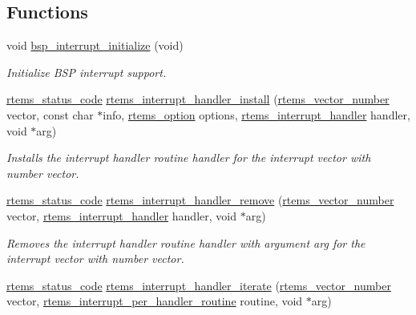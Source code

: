 \subsection*{Functions}
\begin{DoxyCompactItemize}
\item 
void \mbox{\hyperlink{group__bsp__interrupt_gafccb8719531b51a8cf0163febeb42b29}{bsp\+\_\+interrupt\+\_\+initialize}} (void)
\begin{DoxyCompactList}\small\item\em Initialize B\+SP interrupt support. \end{DoxyCompactList}\item 
\mbox{\hyperlink{group__ClassicStatus_ga545d41846817eaba6143d52ee4d9e9fe}{rtems\+\_\+status\+\_\+code}} \mbox{\hyperlink{group__rtems__interrupt__extension_ga086cc450fcdc9e37bfd0744a763dbfd4}{rtems\+\_\+interrupt\+\_\+handler\+\_\+install}} (\mbox{\hyperlink{group__ClassicINTR_ga3e434c197d99f128e78cae4d9358bd8b}{rtems\+\_\+vector\+\_\+number}} vector, const char $\ast$info, \mbox{\hyperlink{group__ClassicOptions_gad26685eb0e60a9650082935c31920e29}{rtems\+\_\+option}} options, \mbox{\hyperlink{group__rtems__interrupt__extension_gab39bd096ab2c3b41d03dace0e9777b08}{rtems\+\_\+interrupt\+\_\+handler}} handler, void $\ast$arg)
\begin{DoxyCompactList}\small\item\em Installs the interrupt handler routine {\itshape handler} for the interrupt vector with number {\itshape vector}. \end{DoxyCompactList}\item 
\mbox{\hyperlink{group__ClassicStatus_ga545d41846817eaba6143d52ee4d9e9fe}{rtems\+\_\+status\+\_\+code}} \mbox{\hyperlink{group__rtems__interrupt__extension_ga90011d3f7a1f614913fd6386f1725b9d}{rtems\+\_\+interrupt\+\_\+handler\+\_\+remove}} (\mbox{\hyperlink{group__ClassicINTR_ga3e434c197d99f128e78cae4d9358bd8b}{rtems\+\_\+vector\+\_\+number}} vector, \mbox{\hyperlink{group__rtems__interrupt__extension_gab39bd096ab2c3b41d03dace0e9777b08}{rtems\+\_\+interrupt\+\_\+handler}} handler, void $\ast$arg)
\begin{DoxyCompactList}\small\item\em Removes the interrupt handler routine {\itshape handler} with argument {\itshape arg} for the interrupt vector with number {\itshape vector}. \end{DoxyCompactList}\item 
\mbox{\hyperlink{group__ClassicStatus_ga545d41846817eaba6143d52ee4d9e9fe}{rtems\+\_\+status\+\_\+code}} \mbox{\hyperlink{group__rtems__interrupt__extension_ga31d23275b676018c06e13c7bedc87983}{rtems\+\_\+interrupt\+\_\+handler\+\_\+iterate}} (\mbox{\hyperlink{group__ClassicINTR_ga3e434c197d99f128e78cae4d9358bd8b}{rtems\+\_\+vector\+\_\+number}} vector, \mbox{\hyperlink{group__rtems__interrupt__extension_gad3e88a9acfac97a5021ff98471f5cd71}{rtems\+\_\+interrupt\+\_\+per\+\_\+handler\+\_\+routine}} routine, void $\ast$arg)

\end{DoxyCompactItemize}
